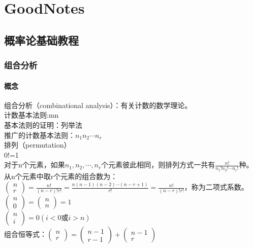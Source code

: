 \documentclass{book}%
\begin{document}
    \part{GoodNotes}
    
    \chapter{概率论基础教程}
    
    \section{组合分析}
    	
	\subsection{概念}
	组合分析（combinational analysis）：有关计数的数学理论。\\
	计数基本法则:mn\\
	基本法则的证明：列举法\\
	推广的计数基本法则：$n_{1}n_{2}\cdots n_{r}$\\
	排列（permutation）\\
	0!=1\\
	对于n个元素，如果$n_{1},n_{2},\cdots,n_{r}$个元素彼此相同，则排列方式一共有$\frac{n!}{{n_{1}} ! {n_{2}} ! \cdots {n_{r}}!}$种。\\
	从n个元素中取r个元素的组合数为：$\begin{pmatrix}n\\r\end{pmatrix}=\frac{n!}{(n-r)!r!}=\frac{n(n-1)(n-2)\cdots (n-r+1)}{r!}=\frac{n!}{(n-r)!r!}$，称为二项式系数。\\
	$\begin{pmatrix} n\\0 \end{pmatrix}=\begin{pmatrix} n \\ n \end{pmatrix}=1$\\
	$\begin{pmatrix} n\\i \end{pmatrix}=0(i<0\text{或}i>n)$\\
	组合恒等式：$\begin{pmatrix}n\\r\end{pmatrix}=\begin{pmatrix}n-1\\r-1\end{pmatrix}+\begin{pmatrix}n-1\\r\end{pmatrix}$\\
\end{document}
